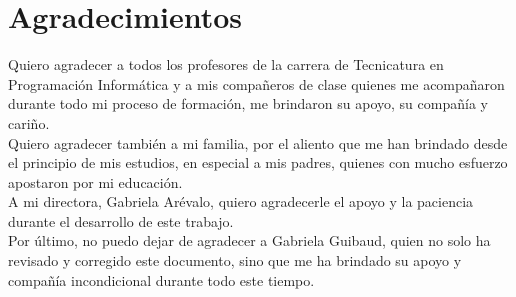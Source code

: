 \section*{Agradecimientos}
\jump[3]
\begin{raggedleft}
	
	Quiero agradecer a todos los profesores de la carrera de Tecnicatura en Programación Informática y a mis compañeros de clase quienes me acompañaron durante todo mi proceso de formación, me brindaron su apoyo, su compañía y cariño.\\
	\jump
	Quiero agradecer también a mi familia, por el aliento que me han brindado desde el principio de mis estudios, en especial a mis padres, quienes con mucho esfuerzo apostaron por mi educación.\\
	\jump
	A mi directora, Gabriela Arévalo, quiero agradecerle el apoyo y la paciencia durante el desarrollo de este trabajo.\\
	\jump
	Por último, no puedo dejar de agradecer a Gabriela Guibaud, quien no solo ha revisado y corregido este documento, sino que me ha brindado su apoyo y compañía incondicional durante todo este tiempo.
	
\end{raggedleft}